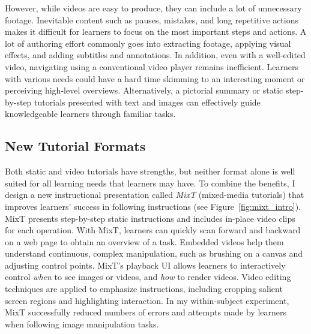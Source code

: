 However, while videos are easy to produce, they can include a lot of unnecessary footage. Inevitable content such as pauses, mistakes, and long repetitive actions makes it difficult for learners to focus on the most important steps and actions. A lot of authoring effort commonly goes into extracting footage, applying visual effects, and adding subtitles and annotations.
%
In addition, even with a well-edited video, navigating using a conventional video player remains inefficient. Learners with various needs could have a hard time skimming to an interesting moment or perceiving high-level overviews. Alternatively, a pictorial summary or static step-by-step tutorials presented with text and images can effectively guide knowledgeable learners through familiar tasks.



\subsection{New Tutorial Formats}

Both static and video tutorials have strengths, but neither format alone is well suited for all learning needs that learners may have.
%
To combine the benefits, I design a new instructional presentation called \emph{MixT} (mixed-media tutorials) that improves learners' success in following instructions (see Figure~\ref{fig:mixt_intro}).
%
MixT presents step-by-step static instructions and includes in-place video clips for each operation.
%
With MixT, learners can quickly scan forward and backward on a web page to obtain an overview of a task. Embedded videos help them understand continuous, complex manipulation, such as brushing on a canvas and adjusting control points.
%
MixT's playback UI allows learners to interactively control \emph{when} to see images or videos, and \emph{how} to render videos.
%
Video editing techniques are applied to emphasize instructions, including cropping salient screen regions and highlighting interaction.
%
In my within-subject experiment, MixT successfully reduced numbers of errors and attempts made by learners when following image manipulation tasks.

